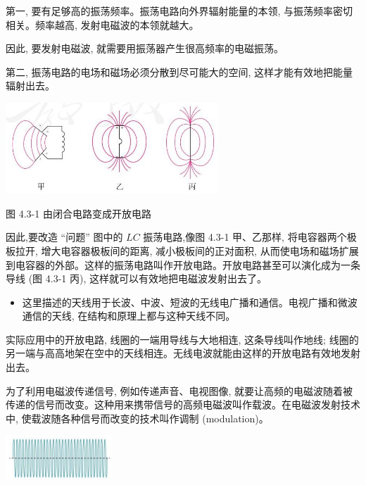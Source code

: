 \documentclass[10pt]{article}
\begin{document}
第一, 要有足够高的振荡频率。振荡电路向外界辐射能量的本领, 与振荡频率密切相关。频率越高, 发射电磁波的本领就越大。

因此, 要发射电磁波, 就需要用振荡器产生很高频率的电磁振荡。

第二, 振荡电路的电场和磁场必须分散到尽可能大的空间, 这样才能有效地把能量辐射出去。

\begin{center}
\includegraphics[max width=0.6\textwidth]{images/01910e72-c5b7-7ed5-a6d4-fb3a5faefc32_85_645831.jpg}
\end{center}

图 4.3-1 由闭合电路变成开放电路

因此,要改造 “问题” 图中的 \({LC}\) 振荡电路,像图 4.3-1 甲、乙那样, 将电容器两个极板拉开, 增大电容器极板间的距离, 减小极板间的正对面积, 从而使电场和磁场扩展到电容器的外部。这样的振荡电路叫作开放电路。开放电路甚至可以演化成为一条导线 (图 4.3-1 丙), 这样就可以有效地把电磁波发射出去了。

\begin{mdframed}

\begin{itemize}
\item 这里描述的天线用于长波、中波、短波的无线电广播和通信。电视广播和微波通信的天线, 在结构和原理上都与这种天线不同。
\end{itemize}

\end{mdframed}

实际应用中的开放电路, 线圈的一端用导线与大地相连, 这条导线叫作地线; 线圈的另一端与高高地架在空中的天线相连。无线电波就能由这样的开放电路有效地发射出去。

为了利用电磁波传递信号, 例如传递声音、电视图像, 就要让高频的电磁波随着被传递的信号而改变。这种用来携带信号的高频电磁波叫作载波。在电磁波发射技术中, 使载波随各种信号而改变的技术叫作调制 (modulation)。

\begin{center}
\includegraphics[max width=0.3\textwidth]{images/01910e72-c5b7-7ed5-a6d4-fb3a5faefc32_86_456599.jpg}
\end{center}
\end{document}
